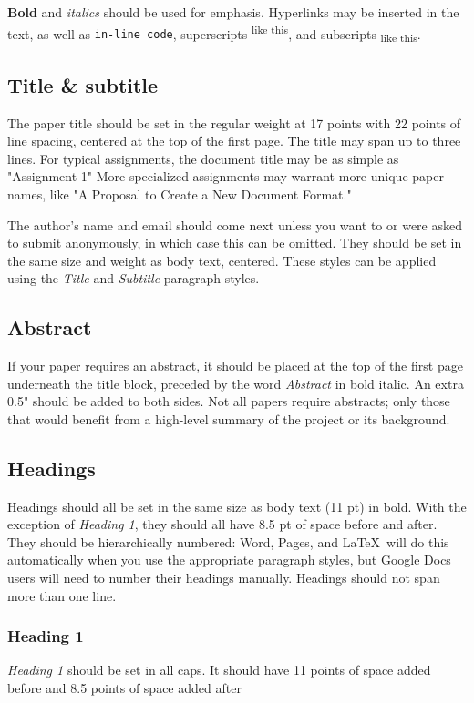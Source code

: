 \documentclass[
	letterpaper, %
]{jdf}
\begin{document}
\textbf{Bold} and \textit{italics} should be used for emphasis. Hyperlinks may be inserted in the text, as well as {\tt in-line code}, superscripts\textsuperscript{ like this}, 
and subscripts\textsubscript{ like this}.

\subsection{Title \& subtitle}
The paper title should be set in the regular weight at 17 points with 22 points of line spacing, centered at the top of the first page. The title may span up to three lines. 
For typical assignments, the document title may be as simple as "Assignment 1" More specialized assignments may warrant more unique paper names, like "A Proposal to Create a New Document Format."

The author’s name and email should come next unless you want to or were asked to submit anonymously, in which case this can be omitted. 
They should be set in the same size and weight as body text, centered. These styles can be applied using the \emph{Title} and \emph{Subtitle} paragraph styles.

\subsection{Abstract}
If your paper requires an abstract, it should be placed at the top of the first page underneath the title block, preceded by the word \emph{Abstract} in bold italic. 
An extra 0.5" should be added to both sides. Not all papers require abstracts; only those that would benefit from a high-level summary of the project or its background.

\subsection{Headings}
Headings should all be set in the same size as body text (11 pt) in bold. With the exception of \emph{Heading 1}, they should all have 8.5 pt of space before and after. 
They should be hierarchically numbered: Word, Pages, and \LaTeX\ will do this automatically when you use the appropriate paragraph styles, but Google Docs users will need to 
number their headings manually. Headings should not span more than one line.

\subsubsection{Heading 1}
\emph{Heading 1} should be set in all caps. It should have 11 points of space added before and 8.5 points of space added after
\end{document}
